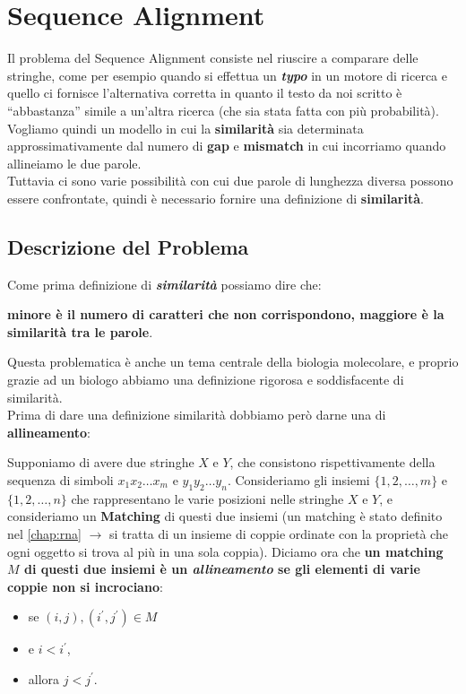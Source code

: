 \chapter{Sequence Alignment}
\label{chap:seqal}

Il problema del Sequence Alignment consiste nel riuscire a comparare
delle stringhe, come per esempio quando si effettua un
\textbf{\emph{typo}} in un motore di ricerca e quello ci fornisce
l'alternativa corretta in quanto il testo da noi scritto è
``abbastanza'' simile a un'altra ricerca (che sia stata fatta con più
probabilità).\\ Vogliamo quindi un modello in cui la \textbf{similarità}
sia determinata approssimativamente dal numero di \textbf{gap} e
\textbf{mismatch} in cui incorriamo quando allineiamo le due parole.\\
Tuttavia ci sono varie possibilità con cui due parole di lunghezza
diversa possono essere confrontate, quindi è necessario fornire una
definizione di \textbf{similarità}.

\section{Descrizione del Problema}

Come prima definizione di \textbf{\emph{similarità}} possiamo dire che:
\begin{myblockquote}
	\textbf{minore è il numero di caratteri che non
		corrispondono, maggiore è la similarità tra le parole}.
\end{myblockquote}

Questa problematica è anche un tema centrale della biologia molecolare,
e proprio grazie ad un biologo abbiamo una definizione rigorosa e
soddisfacente di similarità.\\

Prima di dare una definizione similarità dobbiamo però darne una di
\textbf{allineamento}:
\begin{myblockquote}
	Supponiamo di avere due stringhe
	$X$ e $Y$, che consistono rispettivamente della sequenza di simboli
	$x_1 x_2 \ldots x_m$ e $y_1 y_2 \ldots y_n$.
	Consideriamo gli insiemi $\{1,2,\ldots ,m\}$ e $\{1,2,\ldots ,n\}$
	che rappresentano le varie posizioni nelle stringhe $X$ e $Y$, e
	consideriamo un \textbf{Matching} di questi due insiemi (un matching è
	stato definito nel \autoref{chap:rna}
	$\rightarrow$ si tratta di un insieme di coppie ordinate con la
	proprietà che ogni oggetto si trova al più in una sola coppia).
	Diciamo ora che \textbf{un matching $M$ di questi due
		insiemi è un \emph{allineamento} se gli elementi di varie coppie non si
		incrociano}:
	\begin{itemize}
		\item se $(i,j),(i^{\prime},j^{\prime}) \in M$
		\item e $i < i^{\prime}$,
		\item allora $j < j^{\prime}$.
	\end{itemize}
\end{myblockquote}

